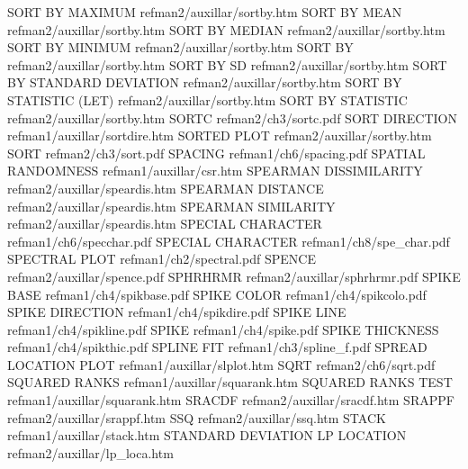 SORT BY MAXIMUM                         refman2/auxillar/sortby.htm
SORT BY MEAN                            refman2/auxillar/sortby.htm
SORT BY MEDIAN                          refman2/auxillar/sortby.htm
SORT BY MINIMUM                         refman2/auxillar/sortby.htm
SORT BY                                 refman2/auxillar/sortby.htm
SORT BY SD                              refman2/auxillar/sortby.htm
SORT BY STANDARD DEVIATION              refman2/auxillar/sortby.htm
SORT BY STATISTIC (LET)                 refman2/auxillar/sortby.htm
SORT BY STATISTIC                       refman2/auxillar/sortby.htm
SORTC                                   refman2/ch3/sortc.pdf
SORT DIRECTION                          refman1/auxillar/sortdire.htm
SORTED PLOT                             refman2/auxillar/sortby.htm
SORT                                    refman2/ch3/sort.pdf
SPACING                                 refman1/ch6/spacing.pdf
SPATIAL RANDOMNESS                      refman1/auxillar/csr.htm
SPEARMAN DISSIMILARITY                  refman2/auxillar/speardis.htm
SPEARMAN DISTANCE                       refman2/auxillar/speardis.htm
SPEARMAN SIMILARITY                     refman2/auxillar/speardis.htm
SPECIAL CHARACTER                       refman1/ch6/specchar.pdf
SPECIAL CHARACTER                       refman1/ch8/spe_char.pdf
SPECTRAL PLOT                           refman1/ch2/spectral.pdf
SPENCE                                  refman2/auxillar/spence.pdf
SPHRHRMR                                refman2/auxillar/sphrhrmr.pdf
SPIKE BASE                              refman1/ch4/spikbase.pdf
SPIKE COLOR                             refman1/ch4/spikcolo.pdf
SPIKE DIRECTION                         refman1/ch4/spikdire.pdf
SPIKE LINE                              refman1/ch4/spikline.pdf
SPIKE                                   refman1/ch4/spike.pdf
SPIKE THICKNESS                         refman1/ch4/spikthic.pdf
SPLINE FIT                              refman1/ch3/spline_f.pdf
SPREAD LOCATION PLOT                    refman1/auxillar/slplot.htm
SQRT                                    refman2/ch6/sqrt.pdf
SQUARED RANKS                           refman1/auxillar/squarank.htm
SQUARED RANKS TEST                      refman1/auxillar/squarank.htm
SRACDF                                  refman2/auxillar/sracdf.htm
SRAPPF                                  refman2/auxillar/srappf.htm
SSQ                                     refman2/auxillar/ssq.htm
STACK                                   refman1/auxillar/stack.htm
STANDARD DEVIATION LP LOCATION          refman2/auxillar/lp_loca.htm
